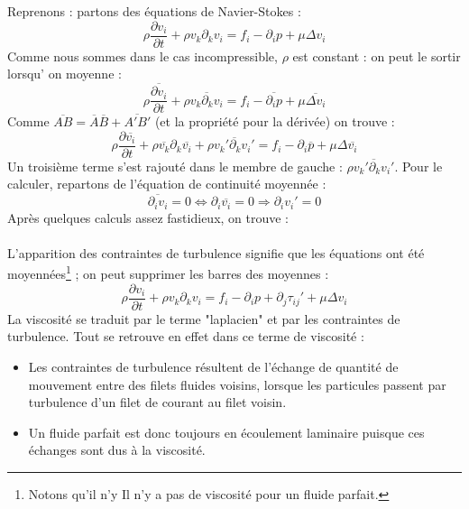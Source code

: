 	Reprenons : partons des équations de Navier-Stokes :
	\begin{equation}
	\rho \frac{\partial v_i}{\partial t} + \rho v_k\partial_kv_i = f_i - \partial_ip + \mu \Delta
	v_i
	\end{equation}
	Comme nous sommes dans le cas incompressible, $\rho$ est constant : on peut le sortir lorsqu'
	on moyenne :
	\begin{equation}
	\rho \frac{\overline{\partial v_i}}{\partial t} + \rho \overline{v_k\partial_kv_i} = f_i - 
	\overline{\partial_ip} + \mu \overline{\Delta v_i}
	\end{equation}
	Comme $\overline{AB} = \overline{A}\overline{B} + 	\overline{A'B'}$ (et la propriété pour la 
	dérivée) on trouve :
	\begin{equation}
	\rho \frac{\partial \overline{v_i}}{\partial t} + \rho \overline{v_k}\partial_k\overline{v_i} +
	\rho\overline{v_k'\partial_k v_i'} = f_i - \partial_i\overline{p} + \mu \Delta\overline{v_i}
	\end{equation}
	Un troisième terme s'est rajouté dans le membre de gauche : $\rho\overline{v_k'\partial_k v_i'}$.
	Pour le calculer, repartons de l'équation de continuité moyennée :
	\begin{equation}
	\overline{\partial_iv_i} = 0 \Leftrightarrow \partial_i\overline{v_i} = 0 \Rightarrow \partial_i
	v_i'=0
	\end{equation}
	Après quelques calculs assez fastidieux, on trouve :\\
	
	\ \\
	L'apparition des contraintes de turbulence signifie que les équations ont été moyennées\footnote{
	Notons qu'il n'y Il n'y a pas de viscosité pour un fluide parfait.} ; on peut supprimer les barres 
	des moyennes :
	\begin{equation}
	\rho \frac{\partial v_i}{\partial t} + \rho v_k\partial_k v_i = f_i - \partial_i p + \partial_j
	\tau_{ij}' +\mu \Delta v_i
	\end{equation}
	La viscosité se traduit par le terme "laplacien" et par les contraintes de turbulence. Tout se
	retrouve en effet dans ce terme de viscosité :
	\begin{itemize}
	\item Les contraintes de turbulence résultent de l'échange de quantité de mouvement entre des 
	filets fluides voisins, lorsque les particules passent par turbulence d'un filet de courant au 
	filet voisin.
	\item Un fluide parfait est donc toujours en écoulement laminaire puisque ces échanges sont dus 
	à la viscosité.
	\end{itemize}
	
